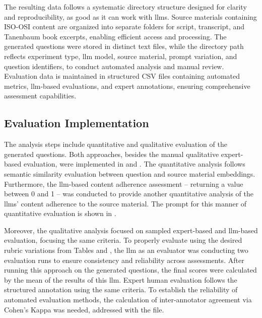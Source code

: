 The resulting data follows a systematic directory structure designed for clarity and reproducibility, as good as it can work with \ac{llms}. Source materials containing ISO-OSI content are organized into separate folders for script, transcript, and Tanenbaum book excerpts, enabling efficient access and processing. The generated questions were stored in distinct text files, while the directory path reflects experiment type, \ac{llm} model, source material, prompt variation, and question identifiers, to conduct automated analysis and manual review. Evaluation data is maintained in structured CSV files containing automated metrics, \ac{llm}-based evaluations, and expert annotations, ensuring comprehensive assessment capabilities.

\subsection{Evaluation Implementation}

The analysis steps include quantitative and qualitative evaluation of the generated questions. Both approaches, besides the manual qualitative expert-based evaluation, were implemented in  and . The quantitative analysis follows semantic similarity evaluation between question and source material embeddings. Furthermore, the \ac{llm}-based content adherence assessment -- returning a value between 0 and 1 -- was conducted to provide another quantitative analysis of the \ac{llms}' content adherence to the source material. The prompt for this manner of quantitative evaluation is shown in .

Moreover, the qualitative analysis focused on sampled expert-based and \ac{llm}-based evaluation, focusing the same criteria. To properly evaluate using the desired rubric variations from Tables  and , the \ac{llm} as an evaluator was conducting two evaluation runs to ensure consistency and reliability across assessments. After running this approach on the generated questions, the final scores were calculated by the mean of the results of this \ac{llm}. Expert human evaluation follows the structured annotation using the same criteria. To establish the reliability of automated evaluation methods, the calculation of inter-annotator agreement via Cohen's Kappa was needed, addressed with the  file.

